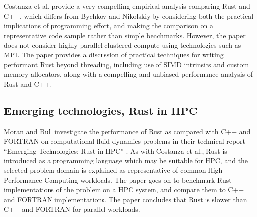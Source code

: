 Costanza et al. provide a very compelling empirical analysis comparing Rust and C++, which differs from Bychkov and Nikolskiy by considering both the practical implications of programming effort, and making the comparison on a representative code sample rather than simple benchmarks. However, the paper does not consider highly-parallel clustered compute using technologies such as MPI. The paper provides a discussion of practical techniques for writing performant Rust beyond threading, including use of SIMD intrinsics and custom memory allocators, along with a compelling and unbiased performance analysis of Rust and C++.


\subsection{Emerging technologies, Rust in HPC}
\label{ssec:moran-bull}

Moran and Bull \cite{moranEmergingTechnologiesRust2023} investigate the performance of Rust as compared with C++ and FORTRAN on computational fluid dynamics problems in their technical report ``Emerging Technologies: Rust in HPC'' \cite{moranEmergingTechnologiesRust2023}. As with Costanza et al., Rust is introduced as a programming language which may be suitable for HPC, and the selected problem domain is explained as representative of common High-Performance Computing workloads. The paper goes on to benchmark Rust implementations of the problem on a HPC system, and compare them to C++ and FORTRAN implementations. The paper concludes that Rust is slower than C++ and FORTRAN for parallel workloads.


